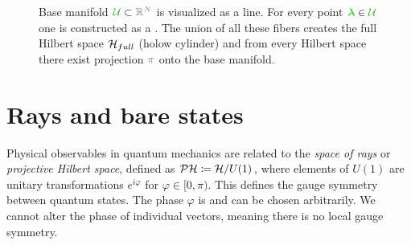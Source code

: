 \begin{figure}[H]
    \centering

\caption{Base manifold $\greenn{\mathcal U}\subset \gray{\R^N}$ is visualized as a line. For every point $\green\llambda\in\greenn{\mathcal U}$ one  is constructed as a . The union of all these fibers creates the full Hilbert space $\mathcal{H}_{full}$ (holow cylinder) and from every Hilbert space there exist projection $\gray{\pi}$ onto the base manifold.}
    \label{fig:wholeBundle}
\end{figure}



\section{Rays and bare states}
Physical observables in quantum mechanics are related to the \emph{space of rays} or \emph{projective Hilbert space}, defined as $\mathcal{P}\mathcal{H}\coloneqq \mathcal{H}/U(1)$, where elements of $U(1)$ are unitary transformations $e^{i\varphi}$ for $\varphi\in[0,\pi)$. This defines the  gauge symmetry between quantum states. The phase $\varphi$ is  and can be chosen arbitrarily. We cannot alter the phase of individual vectors, meaning there is no local gauge symmetry. 

